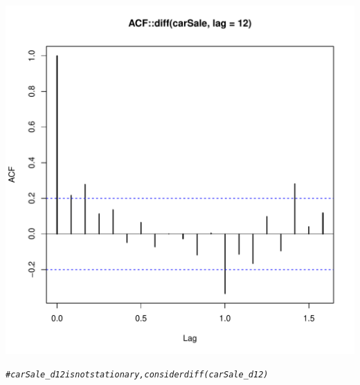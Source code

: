 \documentclass[10pt]{article}\usepackage[]{graphicx}\usepackage[]{color}
\makeatletter
\def\maxwidth{ %
  \ifdim\Gin@nat@width>\linewidth
    \linewidth
  \else
    \Gin@nat@width
  \fi
}
\newcommand{\hlcom}[1]{\textcolor[rgb]{0.678,0.584,0.686}{\textit{#1}}}%
\newenvironment{kframe}{%
 \def\at@end@of@kframe{}%
 \ifinner\ifhmode%
  \def\at@end@of@kframe{\end{minipage}}%
  \begin{minipage}{\columnwidth}%
 \fi\fi%
 \def\FrameCommand##1{\hskip\@totalleftmargin \hskip-\fboxsep
 \colorbox{shadecolor}{##1}\hskip-\fboxsep
     \hskip-\linewidth \hskip-\@totalleftmargin \hskip\columnwidth}%
 \MakeFramed {\advance\hsize-\width
   \@totalleftmargin\z@ \linewidth\hsize
   \@setminipage}}%
 {\par\unskip\endMakeFramed%
 \at@end@of@kframe}
\newenvironment{knitrout}{}{} %
\makeatother
\begin{document}
\begin{knitrout}
\includegraphics[width=\maxwidth]{figure/unnamed-chunk-33-2} 
\begin{kframe}\begin{alltt}
\hlcom{#carSale_d12 is not stationary, consider diff(carSale_d12)}


\end{alltt}
\end{kframe}
\end{knitrout}
\end{document}
